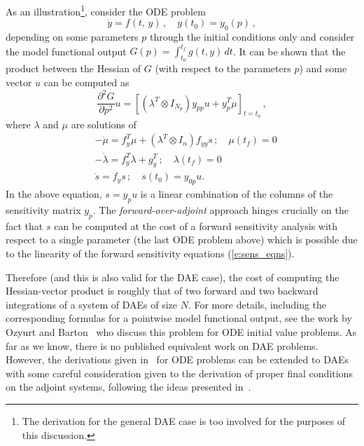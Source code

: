 As an illustration\footnote{The derivation for the general DAE case is too
involved for the purposes of this discussion.}, consider the ODE problem  
\begin{equation*}
{\dot y}  = f(t,\,y) \, , \quad y(t_0)  = y_0(p) \, ,
\end{equation*}
depending on some parameters $p$ through the initial conditions only and
consider the model functional output $G(p) = \int_{t_0}^{t_f} g(t,y) \, dt$.
It can be shown that the product between the Hessian of $G$ (with respect to the 
parameters $p$) and some vector $u$ can be computed as
\begin{equation*}
  \frac{\partial^2 G}{\partial p^2} u = 
  \left[ \left(\lambda^T \otimes I_{N_p} \right) y_{pp}u + y_p^T \mu \right]_{t=t_0} \, ,
\end{equation*}
where $\lambda$ and $\mu$ are solutions of
\begin{equation}
  \begin{split}
    &-\dot\mu = f_y^T\mu + \left(\lambda^T \otimes I_n \right) f_{yy} s \, ; \quad \mu(t_f) = 0 \\
    &-\dot\lambda = f_y^T\lambda + g_y^T \, ; \quad \lambda(t_f) = 0 \\
    &\dot s = f_y s \, ; \quad s(t_0) = y_{0p} u .
  \end{split}
\end{equation}
In the above equation, $s = y_p u$ is a linear combination of the columns of the
sensitivity matrix $y_p$. The {\em forward-over-adjoint} 
approach hinges crucially on the fact that $s$ can be computed at the cost of 
a forward sensitivity analysis with respect to a single parameter (the last 
ODE problem above) which is possible due to the linearity of the forward
sensitivity equations (\ref{e:sens_eqns}).

Therefore (and this is also valid for the DAE case), the cost of computing the 
Hessian-vector product is roughly that of two forward and two backward integrations 
of a system of DAEs of size $N$.
For more details, including the corresponding formulas for a pointwise model
functional output, see the work by Ozyurt and Barton~\cite{OzBa:05} who discuss
this problem for ODE initial value problems. As far as we know, there is no
published equivalent work on DAE problems. However, the derivations given
in~\cite{OzBa:05} for ODE problems can be extended to DAEs with some careful
consideration given to the derivation of proper final conditions on the 
adjoint systems, following the ideas presented in~\cite{CLPS:03}.

